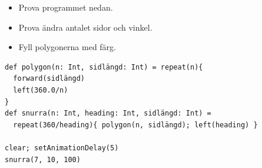 \begin{itemize}

\item {Prova programmet nedan.}
\item {Prova ändra antalet sidor och vinkel.}
\item {Fyll polygonerna med färg.}

\end{itemize}



  

\begin{lstlisting}[basicstyle={\ttfamily\fontsize{16}{19}\selectfont},numbers=none]
def polygon(n: Int, sidlängd: Int) = repeat(n){
  forward(sidlängd)
  left(360.0/n)
}
def snurra(n: Int, heading: Int, sidlängd: Int) = 
  repeat(360/heading){ polygon(n, sidlängd); left(heading) }

clear; setAnimationDelay(5)
snurra(7, 10, 100)
\end{lstlisting}
        
